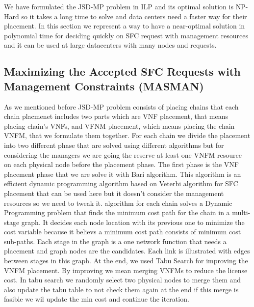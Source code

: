 We have formulated the JSD-MP problem in ILP and its optimal solution is NP-Hard so it takes a long time to solve and data centers need a faster way for their placement.
In this section we represent a way to have a near-optimal solution in polynomial time for deciding quickly on SFC request with management resources and it can be used at large datacenters with many nodes and requests.

\subsection{Maximizing the Accepted SFC Requests with Management Constraints (MASMAN)}
As we mentioned before JSD-MP problem consists of placing chains that each chain placmenet includes two parts which are VNF placement, that means placing chain's VNFs, and VFNM placement, which means placing the chain VNFM, that we formulate them together.
For each chain we divide the placement into two different phase that are solved using different algorithms but for considering the managers we are going the reserve at least one VNFM resource on each physical node before the placement phase.
The first phase is the VNF placement phase that we are solve it with Bari \cite{Bari2015} algorithm.
This algorithm is an efficient dynamic programming algorithm based on Veterbi algorithm for SFC placement that can be used here but it doesn't consider the management resources so we need to tweak it.
\cite{Bari2015} algorithm for each chain solves a Dynamic Programming problem that finds the minimum cost path for the chain in a multi-stage graph.
It decides each node location with its previous one to minimize the cost variable because it believs a minimum cost path consists of minimum cost sub-paths.
Each stage in the graph is a one network function that needs a placement and graph nodes are the candidates. Each link is illustrated with edges between stages in this graph.
At the end, we used Tabu Search for improving the VNFM placement. By improving we mean merging VNFMs to reduce the license cost. In tabu search we randomly select two physical nodes to merge them and also update the tabu table to not check them again at the end if this merge is fasible we wil update the min cost and continue the iteration.

